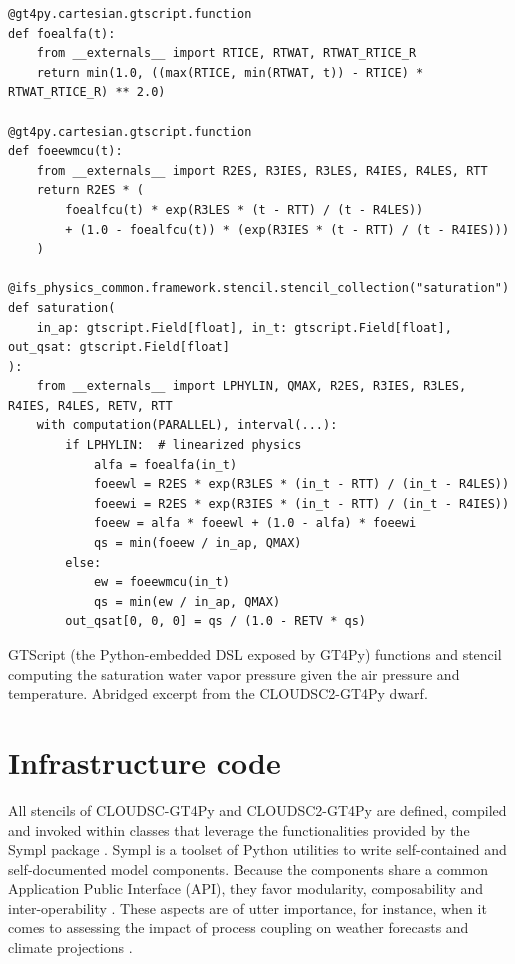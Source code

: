 \documentclass[gmd,manuscript,online]{copernicus}
\theoremstyle{theorem}
\theoremstyle{definition}
\theoremstyle{remark}
\theoremstyle{proposition}
\begin{document}
	\begin{listing}[t!]
		\begin{verbatim}
@gt4py.cartesian.gtscript.function
def foealfa(t):
    from __externals__ import RTICE, RTWAT, RTWAT_RTICE_R
    return min(1.0, ((max(RTICE, min(RTWAT, t)) - RTICE) * RTWAT_RTICE_R) ** 2.0)

@gt4py.cartesian.gtscript.function
def foeewmcu(t):
    from __externals__ import R2ES, R3IES, R3LES, R4IES, R4LES, RTT
    return R2ES * (
        foealfcu(t) * exp(R3LES * (t - RTT) / (t - R4LES))
        + (1.0 - foealfcu(t)) * (exp(R3IES * (t - RTT) / (t - R4IES)))
    )

@ifs_physics_common.framework.stencil.stencil_collection("saturation")
def saturation(
    in_ap: gtscript.Field[float], in_t: gtscript.Field[float], out_qsat: gtscript.Field[float]
):
    from __externals__ import LPHYLIN, QMAX, R2ES, R3IES, R3LES, R4IES, R4LES, RETV, RTT
    with computation(PARALLEL), interval(...):
        if LPHYLIN:  # linearized physics
            alfa = foealfa(in_t)
            foeewl = R2ES * exp(R3LES * (in_t - RTT) / (in_t - R4LES))
            foeewi = R2ES * exp(R3IES * (in_t - RTT) / (in_t - R4IES))
            foeew = alfa * foeewl + (1.0 - alfa) * foeewi
            qs = min(foeew / in_ap, QMAX)
        else:
            ew = foeewmcu(in_t)
            qs = min(ew / in_ap, QMAX)
        out_qsat[0, 0, 0] = qs / (1.0 - RETV * qs)
		\end{verbatim}

		\caption{GTScript (the Python-embedded DSL exposed by GT4Py) functions and stencil computing the saturation water vapor pressure given the air pressure and temperature. Abridged excerpt from the CLOUDSC2-GT4Py dwarf.}
		\label{lst:saturation-stencil}
	\end{listing}

	\section{Infrastructure code}
	\label{section:infrastructure-code}

	All stencils of CLOUDSC-GT4Py and CLOUDSC2-GT4Py are defined, compiled and invoked within classes that leverage the functionalities provided by the Sympl package \citep{monteiro18}. Sympl is a toolset of Python utilities to write self-contained and self-documented model components. Because the components share a common Application Public Interface (API), they favor modularity, composability and inter-operability \citep{schaer19}. These aspects are of utter importance, for instance, when it comes to assessing the impact of process coupling on weather forecasts and climate projections \citep{ubbiali21}.
\end{document}
